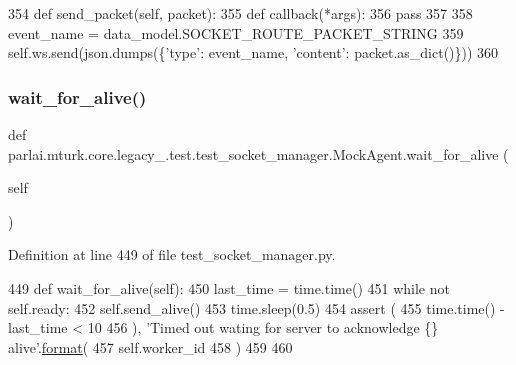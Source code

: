\begin{DoxyCode}
354     \textcolor{keyword}{def }send\_packet(self, packet):
355         \textcolor{keyword}{def }callback(*args):
356             \textcolor{keywordflow}{pass}
357 
358         event\_name = data\_model.SOCKET\_ROUTE\_PACKET\_STRING
359         self.ws.send(json.dumps(\{\textcolor{stringliteral}{'type'}: event\_name, \textcolor{stringliteral}{'content'}: packet.as\_dict()\}))
360 
\end{DoxyCode}
\mbox{\label{classparlai_1_1mturk_1_1core_1_1legacy__2018_1_1test_1_1test__socket__manager_1_1MockAgent_a4ea4840e84079c5503dab6cf1269c01b}} 
\subsubsection{\texorpdfstring{wait\+\_\+for\+\_\+alive()}{wait\_for\_alive()}}
{\footnotesize\ttfamily def parlai.\+mturk.\+core.\+legacy\+\_.\+test.\+test\+\_\+socket\+\_\+manager.\+Mock\+Agent.\+wait\+\_\+for\+\_\+alive (\begin{DoxyParamCaption}\item[{}]{self }\end{DoxyParamCaption})}



Definition at line 449 of file test\+\_\+socket\+\_\+manager.\+py.


\begin{DoxyCode}
449     \textcolor{keyword}{def }wait\_for\_alive(self):
450         last\_time = time.time()
451         \textcolor{keywordflow}{while} \textcolor{keywordflow}{not} self.ready:
452             self.send\_alive()
453             time.sleep(0.5)
454             \textcolor{keyword}{assert} (
455                 time.time() - last\_time < 10
456             ), \textcolor{stringliteral}{'Timed out wating for server to acknowledge \{\} alive'}.\hyperlink{namespaceparlai_1_1chat__service_1_1services_1_1messenger_1_1shared__utils_a32e2e2022b824fbaf80c747160b52a76}{format}(
457                 self.worker\_id
458             )
459 
460 
\end{DoxyCode}


